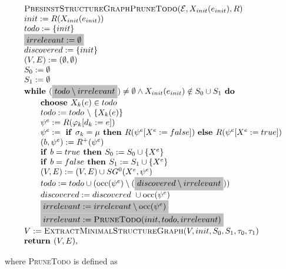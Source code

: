 \documentclass{article}
\newcommand{\Space}{\text{\ }}
\newcommand{\If}{\text{\textbf{if }}}
\newcommand{\Do}{\text{\textbf{ do }}}
\newcommand{\Then}{\text{\textbf{ then }}}
\newcommand{\Else}{\text{\textbf{else }}}
\newcommand{\While}{\text{\textbf{while }}}
\newcommand{\Choose}{\text{\textbf{choose }}}
\newcommand{\Return}{\text{\textbf{return }}}
\begin{document}
\begin{equation*}
\begin{array}{l}
\textsc{PbesinstStructureGraphPruneTodo}(\mathcal{E}, X_{init}(e_{init}), R) \\ 
init:=R(X_{init}(e_{init})) \\
todo:=\{init\} \\
\colorbox{lightgray}{$irrelevant := \emptyset$} \\
discovered:=\{init\} \\
(V,E) :=(\emptyset ,\emptyset ) \\ 
S_0:= \emptyset \\
S_1:= \emptyset \\
\While (\colorbox{lightgray}{$todo \setminus irrelevant$}) \neq \emptyset
\wedge X_{init}(e_{init}) \notin S_0 \cup S_1
\Do \\ 
\qquad \Choose X_{k}(e)\in todo \\ 
\qquad todo:=todo\ \backslash \ \{X_{k}(e)\} \\ 
\qquad \psi ^{e}:=R(\varphi _{k}[d_{k}:=e]) \\ 
\qquad \psi^e := \Space \If \sigma_k = \mu \Then R(\psi^e[X^e := false])
\Space \Else R(\psi^e[X^e := true]) \\
\qquad (b,\psi^e) := R^+(\psi^e) \\
\qquad \If b = true \Then S_0 := S_0 \cup \{ X^e \} \\
\qquad \If b = false \Then S_1 := S_1 \cup \{ X^e \} \\
\qquad (V,E) := (V,E) \cup SG^{0}(X^{e},\psi ^{e}) \\ 
\qquad todo := todo\cup (\mathrm{occ}(\psi ^{e})\setminus (\colorbox{lightgray}{$discovered \setminus irrelevant$})) \\
\qquad discovered := discovered\ \cup \mathrm{occ}(\psi^e) \\
\qquad \colorbox{lightgray}{$irrelevant := irrelevant \setminus \mathrm{occ}(\psi^e)$} \\
\qquad \colorbox{lightgray}{$irrelevant := \textsc{PruneTodo}(init, todo, irrelevant) $}\\
V := \textsc{ExtractMinimalStructureGraph}(V, init, S_0, S_1, \tau_0, \tau_1) \\
\Return(V, E),
\end{array}
\end{equation*}

where \textsc{PruneTodo} is defined as
\end{document}
